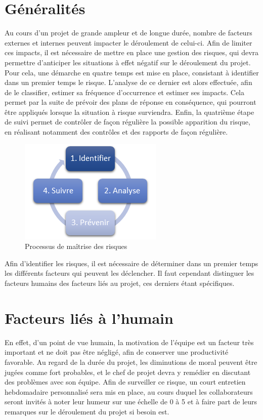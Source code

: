 
\section{Généralités}

Au cours d’un projet de grande ampleur et de longue durée, nombre de facteurs externes et internes peuvent impacter le déroulement de celui-ci. Afin de limiter ces impacts, il est nécessaire de mettre en place une gestion des risques, qui devra permettre d’anticiper les situations à effet négatif sur le déroulement du projet. Pour cela, une démarche en quatre temps est mise en place, consistant à identifier dans un premier temps le risque. L’analyse de ce dernier est alors effectuée, afin de le classifier, estimer sa fréquence d’occurrence et estimer ses impacts. Cela permet par la suite de prévoir des plans de réponse en conséquence, qui pourront être appliqués lorsque la situation à risque surviendra. Enfin, la quatrième étape de suivi permet de contrôler de façon régulière la possible apparition du risque, en réalisant notamment des contrôles et des rapports de façon régulière. \\

\begin{figure}[H]
    \centering
    \label{fig-risque}
    \includegraphics[scale=0.6]{figures/processus_risques.png}
    \caption{Processus de maîtrise des risques}
\end{figure}

Afin d’identifier les risques, il est nécessaire de déterminer dans un premier temps les différents facteurs qui peuvent les déclencher. Il faut cependant distinguer les facteurs humains des facteurs liés au projet, ces derniers étant spécifiques. \\

\section{Facteurs liés à l'humain}

En effet, d’un point de vue humain, la motivation de l’équipe est un facteur très important et ne doit pas être négligé, afin de conserver une productivité favorable. Au regard de la durée du projet, les diminutions de moral peuvent être jugées comme fort probables, et le chef de projet devra y remédier en discutant des problèmes avec son équipe. Afin de surveiller ce risque, un court entretien hebdomadaire personnalisé sera mis en place, au cours duquel les collaborateurs seront invités à noter leur humeur sur une échelle de 0 à 5 et à faire part de leurs remarques sur le déroulement du projet si besoin est. \\
 
